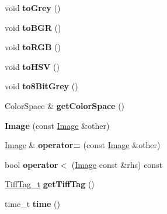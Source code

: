 \begin{DoxyCompactItemize}
\item 
void {\bfseries to\+Grey} ()\hypertarget{classImage_a708cddc0be49dc2a2fb5baeb8de7243d}{}\label{classImage_a708cddc0be49dc2a2fb5baeb8de7243d}

\item 
void {\bfseries to\+B\+GR} ()\hypertarget{classImage_a45ab66f3333a4269d96b8e4737c4b3dd}{}\label{classImage_a45ab66f3333a4269d96b8e4737c4b3dd}

\item 
void {\bfseries to\+R\+GB} ()\hypertarget{classImage_a36d5d12820681cc556f6424dace28592}{}\label{classImage_a36d5d12820681cc556f6424dace28592}

\item 
void {\bfseries to\+H\+SV} ()\hypertarget{classImage_ae0bbaf7bf9b4622ca7ee52912d9f47f2}{}\label{classImage_ae0bbaf7bf9b4622ca7ee52912d9f47f2}

\item 
void {\bfseries to8\+Bit\+Grey} ()\hypertarget{classImage_aede7554ad24dfc8d69e491d35a6d77d8}{}\label{classImage_aede7554ad24dfc8d69e491d35a6d77d8}

\item 
Color\+Space \& {\bfseries get\+Color\+Space} ()\hypertarget{classImage_a70d42eb45b552b08b2d4e91620a43479}{}\label{classImage_a70d42eb45b552b08b2d4e91620a43479}

\item 
{\bfseries Image} (const \hyperlink{classImage}{Image} \&other)\hypertarget{classImage_a5a3bc57bd7ba53f9ae55b1963b9ba0a1}{}\label{classImage_a5a3bc57bd7ba53f9ae55b1963b9ba0a1}

\item 
\hyperlink{classImage}{Image} \& {\bfseries operator=} (const \hyperlink{classImage}{Image} \&other)\hypertarget{classImage_a3037a583d17594b1835d9b6b8d09875c}{}\label{classImage_a3037a583d17594b1835d9b6b8d09875c}

\item 
bool {\bfseries operator$<$} (\hyperlink{classImage}{Image} const \&rhs) const \hypertarget{classImage_a084be7e5413180208d54077f17bf124f}{}\label{classImage_a084be7e5413180208d54077f17bf124f}

\item 
\hyperlink{structImage_1_1TiffTag__t}{Tiff\+Tag\+\_\+t} {\bfseries get\+Tiff\+Tag} ()\hypertarget{classImage_ac406cd1b38c6cadd4f93b8b40b64e258}{}\label{classImage_ac406cd1b38c6cadd4f93b8b40b64e258}

\item 
time\+\_\+t {\bfseries time} ()\hypertarget{classImage_a30253abde880671f30418829d8fba213}{}\label{classImage_a30253abde880671f30418829d8fba213}


\end{DoxyCompactItemize}
